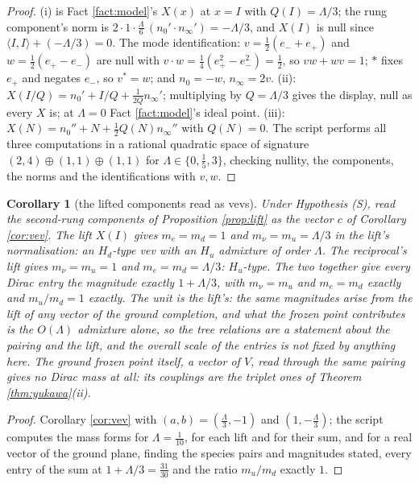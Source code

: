 \documentclass[11pt]{article}
\newtheorem{corollary}[theorem]{Corollary}
\theoremstyle{definition}
\newcommand{\ip}[2]{\langle #1, #2\rangle}
\newcommand{\nO}{n_{0}}
\newcommand{\nInf}{n_{\infty}}
\begin{document}
\begin{proof}
(i) is Fact \ref{fact:model}'s $X(x)$ at $x = I$ with $Q(I) = \Lambda/3$; the rung component's norm is $2 \cdot 1 \cdot \tfrac{\Lambda}{6}\,(\nO' \cdot \nInf') = -\Lambda/3$, and $X(I)$ is null since $\ip{I}{I} + (-\Lambda/3) = 0$. The mode identification: $v = \tfrac12(e_{-} + e_{+})$ and $w = \tfrac12(e_{+} - e_{-})$ are null with $v \cdot w = \tfrac14(e_{+}^{2} - e_{-}^{2}) = \tfrac12$, so $vw + wv = 1$; $*$ fixes $e_{+}$ and negates $e_{-}$, so $v^{*} = w$; and $\nO = -w$, $\nInf = 2v$. (ii): $X(I/Q) = \nO' + I/Q + \tfrac{1}{2Q}\nInf'$; multiplying by $Q = \Lambda/3$ gives the display, null as every $X$ is; at $\Lambda = 0$ Fact \ref{fact:model}'s ideal point. (iii): $X(N) = \nO'' + N + \tfrac12 Q(N)\nInf''$ with $Q(N) = 0$. The script performs all three computations in a rational quadratic space of signature $(2,4) \oplus (1,1) \oplus (1,1)$ for $\Lambda \in \{0, \tfrac15, 3\}$, checking nullity, the components, the norms and the identifications with $v, w$.
\end{proof}

\begin{corollary}[the lifted components read as vevs]\label{cor:read}
Under Hypothesis (S), read the second-rung components of Proposition \ref{prop:lift} as the vector $c$ of Corollary \ref{cor:vev}. The lift $X(I)$ gives $m_{e} = m_{d} = 1$ and $m_{\nu} = m_{u} = \Lambda/3$ in the lift's normalisation: an $H_{d}$-type vev with an $H_{u}$ admixture of order $\Lambda$. The reciprocal's lift gives $m_{\nu} = m_{u} = 1$ and $m_{e} = m_{d} = \Lambda/3$: $H_{u}$-type. The two together give every Dirac entry the magnitude exactly $1 + \Lambda/3$, with $m_{\nu} = m_{u}$ and $m_{e} = m_{d}$ exactly and $m_{u}/m_{d} = 1$ exactly. The unit is the lift's: the same magnitudes arise from the lift of any vector of the ground completion, and what the frozen point contributes is the $O(\Lambda)$ admixture alone, so the tree relations are a statement about the pairing and the lift, and the overall scale of the entries is not fixed by anything here. The ground frozen point itself, a vector of $V$, read through the same pairing gives no Dirac mass at all: its couplings are the triplet ones of Theorem \ref{thm:yukawa}(ii).
\end{corollary}

\begin{proof}
Corollary \ref{cor:vev} with $(a, b) = (\tfrac{\Lambda}{3}, -1)$ and $(1, -\tfrac{\Lambda}{3})$; the script computes the mass forms for $\Lambda = \tfrac{1}{10}$, for each lift and for their sum, and for a real vector of the ground plane, finding the species pairs and magnitudes stated, every entry of the sum at $1 + \Lambda/3 = \tfrac{31}{30}$ and the ratio $m_{u}/m_{d}$ exactly $1$.
\end{proof}
\end{document}

